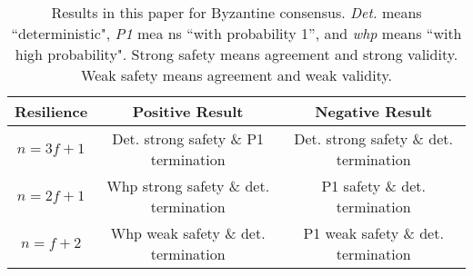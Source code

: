 \begin{table}[ht]
  \centering  %

  \begin{tabular}{ccc} %
    \toprule  %
    Resilience & Positive Result & Negative Result \\
    \midrule  %
    $n = 3f + 1$ & Det. strong safety \& P1 termination & Det. strong safety \& det. termination \\
    $n = 2f + 1$ & Whp strong safety \& det. termination & P1 safety \& det. termination \\
    $n = f + 2$ & Whp weak safety \& det. termination & P1 weak safety \& det. termination \\
    \bottomrule  %
  \end{tabular}
  \caption{Results in this paper for Byzantine consensus. 
  \textit{Det.} means ``deterministic", \textit{P1} mea ns ``with probability 1'', and \textit{whp} means ``with high probability". Strong safety means agreement and strong validity. Weak safety means agreement and weak validity.
  }  %
\end{table}

